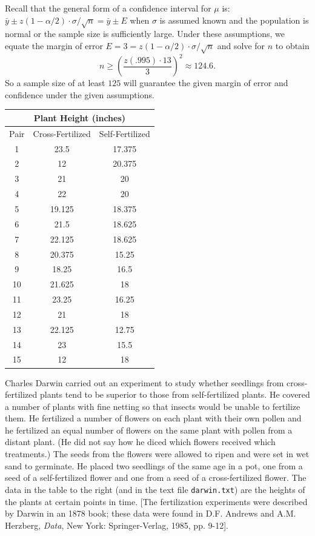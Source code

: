 \documentclass{homework}
\begin{document}
\begin{solution}
  Recall that the general form of a confidence interval for $\mu$ is: $\bar y
  \pm z(1-\alpha/2) \cdot \sigma/\sqrt n = \bar y \pm E$ when $\sigma$ is
  assumed known and the population is normal or the sample size is sufficiently
  large.  Under these assumptions, we equate the margin of error $E = 3 = z(1-\alpha/2) \cdot \sigma/\sqrt n$ and solve for $n$
  to obtain
  $$
    n \ge \left(\frac{z(.995) \cdot 13}{3} \right)^2 \approx 124.6.
  $$
  So a sample size of at least $125$ will guarantee the given margin of error and confidence under the given assumptions.  
\end{solution}

\begin{longproblem}
\begin{table}
\renewcommand{\arraystretch}{1.3}
\begin{tabular}{c c c}
\hline
\multicolumn{3}{c}{Plant Height (inches)} \\ \hline
Pair & Cross-Fertilized & Self-Fertilized\\\hline
 1& 23.5  & 17.375\\
 2& 12     &20.375\\
 3& 21    & 20\\
 4& 22    & 20\\
 5& 19.125& 18.375\\
 6& 21.5  & 18.625\\
 7& 22.125& 18.625\\
 8& 20.375& 15.25\\
 9& 18.25 & 16.5\\
10& 21.625& 18\\
11& 23.25 & 16.25\\
12& 21    & 18\\
13& 22.125& 12.75\\
14& 23    & 15.5\\
15& 12    & 18\\\hline
\end{tabular}
\end{table}

  Charles Darwin carried out an experiment to study whether seedlings from
  cross-fertilized plants tend to be superior to those from self-fertilized
  plants.  He covered a number of plants with fine netting so that insects
  would be unable to fertilize them.  He fertilized a number of flowers on each
  plant with their own pollen and he fertilized an equal number of flowers on
  the same plant with pollen from a distant plant.  (He did not say how he
  diced which flowers received which treatments.)  The seeds from the flowers
  were allowed to ripen and were set in wet sand to germinate.  He placed two
  seedlings of the same age in a pot, one from a seed of a self-fertilized
  flower and one from a seed of a cross-fertilized flower.  The data in the
  table to the right (and in the text file \texttt{darwin.txt}) are the heights
  of the plants at certain points in time.  [The fertilization experiments were
  described by Darwin in an 1878 book; these data were found in D.F. Andrews
  and A.M. Herzberg, \emph{Data}, New York: Springer-Verlag, 1985, pp. 9-12].
\end{longproblem}
\end{document}
